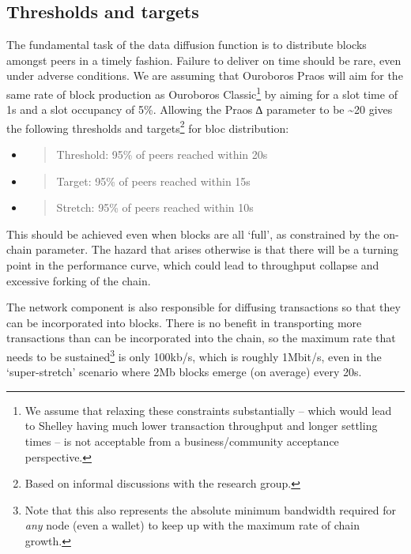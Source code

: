 \documentclass[11pt,a4paper]{article}
\begin{document}
\subsection{Thresholds and targets}
\label{thresholds-and-targets}

The fundamental task of the data diffusion function is to distribute
blocks amongst peers in a timely fashion. Failure to deliver on time
should be rare, even under adverse conditions. We are assuming that
Ouroboros Praos will aim for the same rate of block production as
Ouroboros Classic\footnote{We assume that relaxing these constraints
  substantially -- which would lead to Shelley having much lower
  transaction throughput and longer settling times -- is not acceptable
  from a business/community acceptance perspective.} by aiming for a
slot time of 1s and a slot occupancy of 5\%. Allowing the Praos ∆
parameter to be \textasciitilde{}20 gives the following thresholds and
targets\footnote{Based on informal discussions with the research group.}
for bloc distribution:


\begin{itemize}
\item
  \begin{quote}
  Threshold: 95\% of peers reached within 20s
  \end{quote}
\item
  \begin{quote}
  Target: 95\% of peers reached within 15s
  \end{quote}
\item
  \begin{quote}
  Stretch: 95\% of peers reached within 10s
  \end{quote}
\end{itemize}

This should be achieved even when blocks are all `full', as constrained
by the on-chain parameter. The hazard that arises otherwise is that
there will be a turning point in the performance curve, which could lead
to throughput collapse and excessive forking of the chain.

The network component is also responsible for diffusing transactions so
that they can be incorporated into blocks. There is no benefit in
transporting more transactions than can be incorporated into the chain,
so the maximum rate that needs to be sustained\footnote{Note that this
  also represents the absolute minimum bandwidth required for \emph{any}
  node (even a wallet) to keep up with the maximum rate of chain growth.}
is only 100kb/s, which is roughly 1Mbit/s, even in the `super-stretch'
scenario where 2Mb blocks emerge (on average) every 20s.
\end{document}
